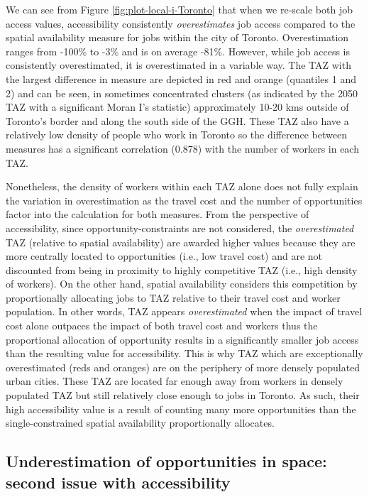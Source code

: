 \documentclass[]{elsarticle} %
\begin{document}
We can see from Figure \ref{fig:plot-local-i-Toronto} that when we
re-scale both job access values, accessibility consistently
\emph{overestimates} job access compared to the spatial availability
measure for jobs within the city of Toronto. Overestimation ranges from
-100\% to -3\% and is on average -81\%. However, while job access is
consistently overestimated, it is overestimated in a variable way. The
TAZ with the largest difference in measure are depicted in red and
orange (quantiles 1 and 2) and can be seen, in sometimes concentrated
clusters (as indicated by the 2050 TAZ with a significant Moran I's
statistic) approximately 10-20 kms outside of Toronto's border and along
the south side of the GGH. These TAZ also have a relatively low density
of people who work in Toronto so the difference between measures has a
significant correlation (0.878) with the number of workers in each TAZ.

Nonetheless, the density of workers within each TAZ alone does not fully
explain the variation in overestimation as the travel cost and the
number of opportunities factor into the calculation for both measures.
From the perspective of accessibility, since opportunity-constraints are
not considered, the \emph{overestimated} TAZ (relative to spatial
availability) are awarded higher values because they are more centrally
located to opportunities (i.e., low travel cost) and are not discounted
from being in proximity to highly competitive TAZ (i.e., high density of
workers). On the other hand, spatial availability considers this
competition by proportionally allocating jobs to TAZ relative to their
travel cost and worker population. In other words, TAZ appears
\emph{overestimated} when the impact of travel cost alone outpaces the
impact of both travel cost and workers thus the proportional allocation
of opportunity results in a significantly smaller job access than the
resulting value for accessibility. This is why TAZ which are
exceptionally overestimated (reds and oranges) are on the periphery of
more densely populated urban cities. These TAZ are located far enough
away from workers in densely populated TAZ but still relatively close
enough to jobs in Toronto. As such, their high accessibility value is a
result of counting many more opportunities than the single-constrained
spatial availability proportionally allocates.

\hypertarget{underestimation-of-opportunities-in-space-second-issue-with-accessibility}{%
\subsection{Underestimation of opportunities in space: second issue with
accessibility}\label{underestimation-of-opportunities-in-space-second-issue-with-accessibility}}
\end{document}

